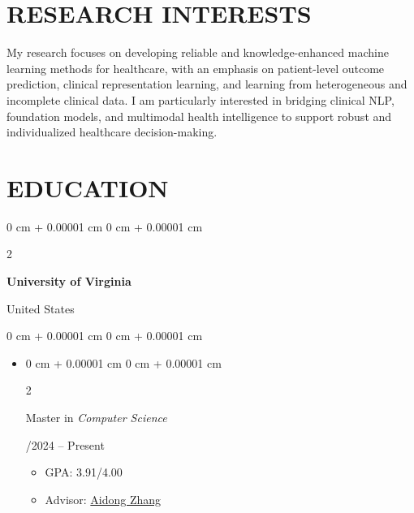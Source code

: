 \documentclass[10pt, letterpaper]{article}
\newenvironment{highlights}{
    \begin{itemize}[
        topsep=0.10 cm,
        parsep=0.10 cm,
        partopsep=0pt,
        itemsep=0pt,
        leftmargin=0 cm + 10pt
    ]
}{
    \end{itemize}
} %
\newenvironment{highlightsforbulletentries}{
    \begin{itemize}[
        topsep=0.10 cm,
        parsep=0.10 cm,
        partopsep=0pt,
        itemsep=0pt,
        leftmargin=10pt
    ]
}{
    \end{itemize}
} %
\newenvironment{onecolentry}{
    \begin{adjustwidth}{
        0 cm + 0.00001 cm
    }{
        0 cm + 0.00001 cm
    }
}{
    \end{adjustwidth}
} %
\newenvironment{twocolentry}[2][]{
    \onecolentry
    \def\secondColumn{#2}
    \setcolumnwidth{\fill, 4.5 cm}
    \begin{paracol}{2}
}{
    \switchcolumn \raggedleft \secondColumn
    \end{paracol}
    \endonecolentry
} %
\begin{document}
    \section{RESEARCH INTERESTS}
My research focuses on developing reliable and knowledge-enhanced machine learning methods for healthcare, with an emphasis on patient-level outcome prediction, clinical representation learning, and learning from heterogeneous and incomplete clinical data. I am particularly interested in bridging clinical NLP, foundation models, and multimodal health intelligence to support robust and individualized healthcare decision-making.
    
   \section{EDUCATION}

\begin{twocolentry}{
    United States
}
    \textbf{University of Virginia}
\end{twocolentry}

\vspace{0.05 cm}
\begin{onecolentry}
    \begin{highlights}
        \item \begin{twocolentry}{
            01/2024 -- Present
        }
            Master in \textit{Computer Science}
        \end{twocolentry}
        \begin{highlights}
            \item GPA: 3.91/4.00
            \item Advisor: \href{https://www.cs.virginia.edu/~az9eg/website/home.html}{Aidong Zhang}
        \end{highlights}
    \end{highlights}
\end{onecolentry}
\end{document}
